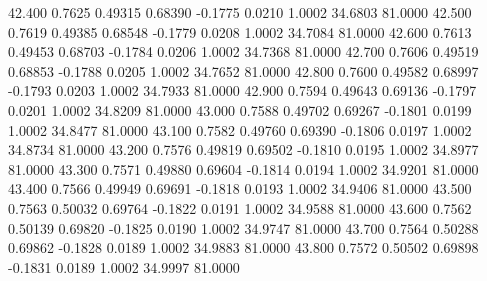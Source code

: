   42.400   0.7625   0.49315   0.68390  -0.1775   0.0210   1.0002  34.6803  81.0000
  42.500   0.7619   0.49385   0.68548  -0.1779   0.0208   1.0002  34.7084  81.0000
  42.600   0.7613   0.49453   0.68703  -0.1784   0.0206   1.0002  34.7368  81.0000
  42.700   0.7606   0.49519   0.68853  -0.1788   0.0205   1.0002  34.7652  81.0000
  42.800   0.7600   0.49582   0.68997  -0.1793   0.0203   1.0002  34.7933  81.0000
  42.900   0.7594   0.49643   0.69136  -0.1797   0.0201   1.0002  34.8209  81.0000
  43.000   0.7588   0.49702   0.69267  -0.1801   0.0199   1.0002  34.8477  81.0000
  43.100   0.7582   0.49760   0.69390  -0.1806   0.0197   1.0002  34.8734  81.0000
  43.200   0.7576   0.49819   0.69502  -0.1810   0.0195   1.0002  34.8977  81.0000
  43.300   0.7571   0.49880   0.69604  -0.1814   0.0194   1.0002  34.9201  81.0000
  43.400   0.7566   0.49949   0.69691  -0.1818   0.0193   1.0002  34.9406  81.0000
  43.500   0.7563   0.50032   0.69764  -0.1822   0.0191   1.0002  34.9588  81.0000
  43.600   0.7562   0.50139   0.69820  -0.1825   0.0190   1.0002  34.9747  81.0000
  43.700   0.7564   0.50288   0.69862  -0.1828   0.0189   1.0002  34.9883  81.0000
  43.800   0.7572   0.50502   0.69898  -0.1831   0.0189   1.0002  34.9997  81.0000
